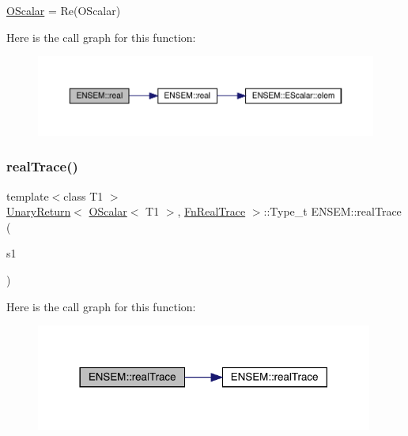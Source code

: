 \mbox{\hyperlink{classENSEM_1_1OScalar}{O\+Scalar}} = Re(\+O\+Scalar) 

Here is the call graph for this function\+:\nopagebreak
\begin{figure}[H]
\begin{center}
\leavevmode
\includegraphics[width=350pt]{d1/d71/group__obsscalar_gaad780424129e881b69f2435599861fb2_cgraph}
\end{center}
\end{figure}
\mbox{\label{group__obsscalar_ga3314cb92fadaf86f0fa6dfe446ddc388}} 
\subsubsection{\texorpdfstring{realTrace()}{realTrace()}}
{\footnotesize\ttfamily template$<$class T1 $>$ \\
\mbox{\hyperlink{structENSEM_1_1UnaryReturn}{Unary\+Return}}$<$ \mbox{\hyperlink{classENSEM_1_1OScalar}{O\+Scalar}}$<$ T1 $>$, \mbox{\hyperlink{structENSEM_1_1FnRealTrace}{Fn\+Real\+Trace}} $>$\+::Type\+\_\+t E\+N\+S\+E\+M\+::real\+Trace (\begin{DoxyParamCaption}\item[{const \mbox{\hyperlink{classENSEM_1_1OScalar}{O\+Scalar}}$<$ T1 $>$ \&}]{s1 }\end{DoxyParamCaption})\hspace{0.3cm}{\ttfamily [inline]}}

Here is the call graph for this function\+:\nopagebreak
\begin{figure}[H]
\begin{center}
\leavevmode
\includegraphics[width=314pt]{d1/d71/group__obsscalar_ga3314cb92fadaf86f0fa6dfe446ddc388_cgraph}
\end{center}
\end{figure}
\mbox{\label{group__obsscalar_gad5154b123a75f53178134d8518242639}} 
